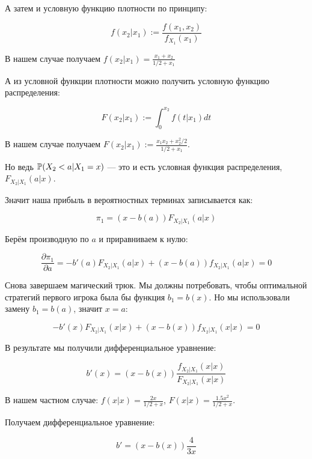 \begin{enumerate}
А затем и условную функцию плотности по принципу:

\begin{equation}
f(x_{2}|x_{1}):=\frac{f(x_{1},x_{2})}{f_{X_{1}}(x_{1})}
\end{equation}

В нашем случае получаем $ f(x_{2}|x_{1})=\frac{x_{1}+x_{2}}{1/2+x_{1}} $

А из условной функции плотности можно получить условную функцию распределения:

\begin{equation}
F(x_{2}|x_{1}):=\int_{0}^{x_{2}} f(t|x_{1}) dt
\end{equation}

В нашем случае получаем $F(x_{2}|x_{1}):=\frac{x_{1}x_{2}+x_{2}^{2}/2}{1/2+x_{1}}$.

Но ведь $ \P(X_{2}<a|X_{1}=x) $ — это и есть условная функция распределения, $ F_{X_{2}|X_{1}}(a|x) $.

Значит наша прибыль в вероятностных терминах записывается как:

\begin{equation}
\pi_{1}=(x-b(a)) F_{X_{2}|X_{1}}(a|x)
\end{equation}

Берём производную по $ a $ и приравниваем к нулю:

\begin{equation}
\frac{\partial \pi_{1}}{\partial a}=-b'(a) F_{X_{2}|X_{1}}(a|x)+(x-b(a))f_{X_{2}|X_{1}}(a|x)=0
\end{equation}

Снова завершаем магический трюк. Мы должны потребовать, чтобы оптимальной стратегий первого игрока была бы функция $b_{1}=b(x)  $. Но мы использовали замену $ b_{1}=b(a) $, значит $ x=a $:


\begin{equation}
-b'(x) F_{X_{2}|X_{1}}(x|x)+(x-b(x))f_{X_{2}|X_{1}}(x|x)=0
\end{equation}

В результате мы получили дифференциальное уравнение:

\begin{equation}
b'(x)=(x-b(x))\frac{f_{X_{2}|X_{1}}(x|x)}{F_{X_{2}|X_{1}}(x|x)}
\end{equation}

В нашем частном случае: $ f(x|x)=\frac{2x}{1/2+x} $, $ F(x|x)=\frac{1.5x^2}{1/2+x} $.

Получаем дифференциальное уравнение:

\begin{equation}
b'=(x-b(x))\frac{4}{3x}
\end{equation}


\end{enumerate}
